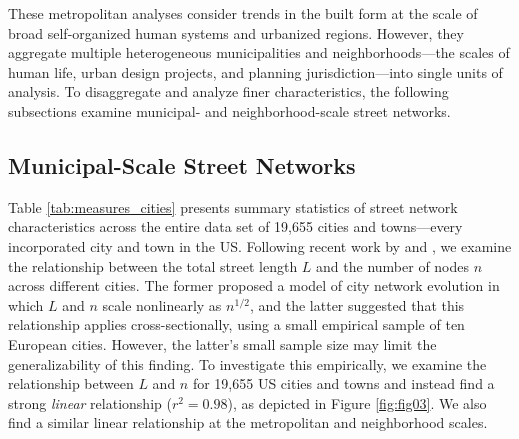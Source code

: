 \documentclass[Afour,sageh,times]{sagej}
\begin{document}
These metropolitan analyses consider trends in the built form at the scale of broad self-organized human systems and urbanized regions. However, they aggregate multiple heterogeneous municipalities and neighborhoods---the scales of human life, urban design projects, and planning jurisdiction---into single units of analysis. To disaggregate and analyze finer characteristics, the following subsections examine municipal- and neighborhood-scale street networks.



\subsection{Municipal-Scale Street Networks}

Table \ref{tab:measures_cities} presents summary statistics of street network characteristics across the entire data set of 19,655 cities and towns---every incorporated city and town in the US. Following recent work by \citet{barthelemy_modeling_2008} and \citet{strano_urban_2013}, we examine the relationship between the total street length $L$ and the number of nodes $n$ across different cities. The former proposed a model of city network evolution in which $L$ and $n$ scale nonlinearly as $n^{1/2}$, and the latter suggested that this relationship applies cross-sectionally, using a small empirical sample of ten European cities. However, the latter's small sample size may limit the generalizability of this finding. To investigate this empirically, we examine the relationship between $L$ and $n$ for 19,655 US cities and towns and instead find a strong \emph{linear} relationship ($r^{2}=0.98$), as depicted in Figure \ref{fig:fig03}. We also find a similar linear relationship at the metropolitan and neighborhood scales.
\end{document}
